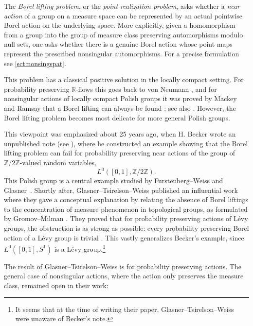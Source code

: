 \documentclass{amsart}
\numberwithin{equation}{subsection}
\theoremstyle{plain}
\theoremstyle{definition}
\theoremstyle{plain}
\begin{document}
The \emph{Borel lifting problem}, or the \emph{point-realization problem}, asks whether a \emph{near action} of a group on a measure space can be represented by an actual pointwise Borel action on the underlying space. More explicitly, given a homomorphism from a group into the group of measure class preserving automorphisms modulo null sets, one asks whether there is a genuine Borel action whose point maps represent the prescribed nonsingular automorphisms. For a precise formulation see \cref{sct:nonsingspat}.

\smallskip

This problem has a classical positive solution in the locally compact setting. For probability preserving \(\mathbb{R}\)-flows this goes back to von Neumann \cite{neumann1932operator}, and for nonsingular actions of locally compact Polish groups it was proved by Mackey and Ramsay that a Borel lifting can always be found \cite{mackey1962point,ramsay1971virtual}; see also \cite{glasner2005spatial,danilenko2000,kwiatkowska2011,tornquist2011pointwise}. However, the Borel lifting problem becomes most delicate for more general Polish groups.

\smallskip

This viewpoint was emphasized about 25 years ago, when H. Becker wrote an unpublished note (see \cite[p.~150]{Pestov2006}), where he constructed an example showing that the Borel lifting problem can fail for probability preserving near actions of the group of \(\mathbb{Z}/2\mathbb{Z}\)-valued random variables,
\[L^{0}\left(\left[0,1\right],\mathbb{Z}/2\mathbb{Z}\right).\]
This Polish group is a central example studied by Furstenberg--Weiss and Glasner~\cite[Thm.~1.3]{glasner1998minimal}. Shortly after, Glasner--Tsirelson--Weiss published an influential work where they gave a conceptual explanation by relating the absence of Borel liftings to the concentration of measure phenomenon in topological groups, as formulated by Gromov--Milman \cite{milman1971new,gromov1983,milman1988heritage}. They proved that for probability preserving actions of L\'{e}vy groups, the obstruction is as strong as possible: every probability preserving Borel action of a L\'{e}vy group is trivial \cite{glasner2005automorphism}. This vastly generalizes Becker's example, since \(L^{0}\left(\left[0,1\right],S^{1}\right)\) is a L\'{e}vy group.\footnote{It seems that at the time of writing their paper, Glasner--Tsirelson--Weiss were unaware of Becker's note.}

\smallskip

The result of Glasner--Tsirelson--Weiss is for probability preserving actions. The general case of nonsingular actions, where the action only preserves the measure class, remained open in their work:
\end{document}

